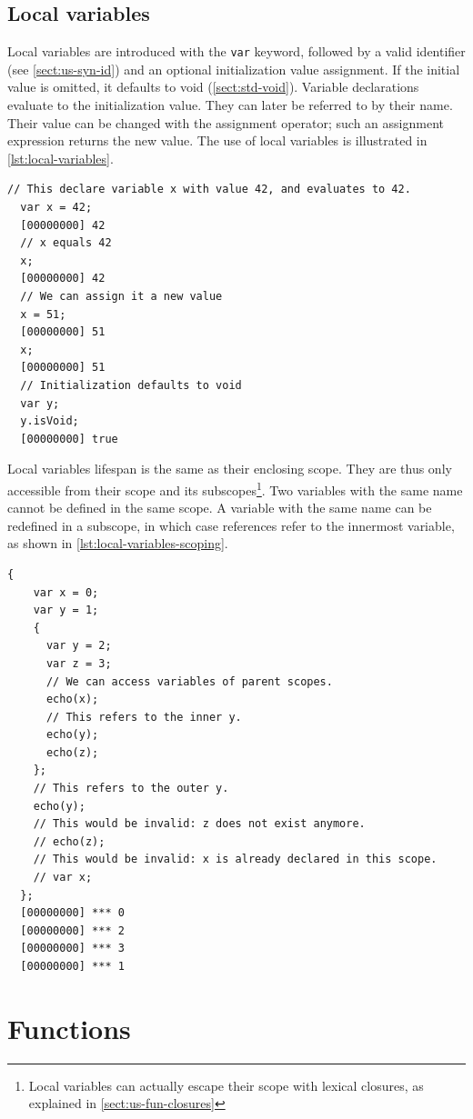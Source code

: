 \documentclass[openright,twoside,12pt]{report}
\newcommand   {\floatpos}          {htbp}
\newcommand{\lst}[1]{\autoref{lst:#1}}
\newcommand{\sect}[1]{\autoref{sect:#1}}
\begin{document}
\subsection{Local variables}

Local variables are introduced with the \lstinline|var| keyword,
followed by a valid identifier (see \sect{us-syn-id}) and an optional
initialization value assignment. If the initial value is omitted, it
defaults to void (\sect{std-void}). Variable declarations evaluate to
the initialization value. They can later be referred to by their
name. Their value can be changed with the assignment operator; such an
assignment expression returns the new value. The use of local
variables is illustrated in \lst{local-variables}.

\begin{lstlisting}[caption=Using local variables,
  label=lst:local-variables,float=\floatpos]
  // This declare variable x with value 42, and evaluates to 42.
  var x = 42;
  [00000000] 42
  // x equals 42
  x;
  [00000000] 42
  // We can assign it a new value
  x = 51;
  [00000000] 51
  x;
  [00000000] 51
  // Initialization defaults to void
  var y;
  y.isVoid;
  [00000000] true
\end{lstlisting}

Local variables lifespan is the same as their enclosing scope. They
are thus only accessible from their scope and its
subscopes\footnote{Local variables can actually escape their scope
  with lexical closures, as explained in \sect{us-fun-closures}}. Two
variables with the same name cannot be defined in the same scope. A
variable with the same name can be redefined in a subscope, in which
case references refer to the innermost variable, as shown in
\lst{local-variables-scoping}.

\begin{lstlisting}[caption=Local variables scoping,
  label=lst:local-variables-scoping,float=\floatpos]
  {
    var x = 0;
    var y = 1;
    {
      var y = 2;
      var z = 3;
      // We can access variables of parent scopes.
      echo(x);
      // This refers to the inner y.
      echo(y);
      echo(z);
    };
    // This refers to the outer y.
    echo(y);
    // This would be invalid: z does not exist anymore.
    // echo(z);
    // This would be invalid: x is already declared in this scope.
    // var x;
  };
  [00000000] *** 0
  [00000000] *** 2
  [00000000] *** 3
  [00000000] *** 1
\end{lstlisting}

\FloatBarrier
\section{Functions}
\end{document}
